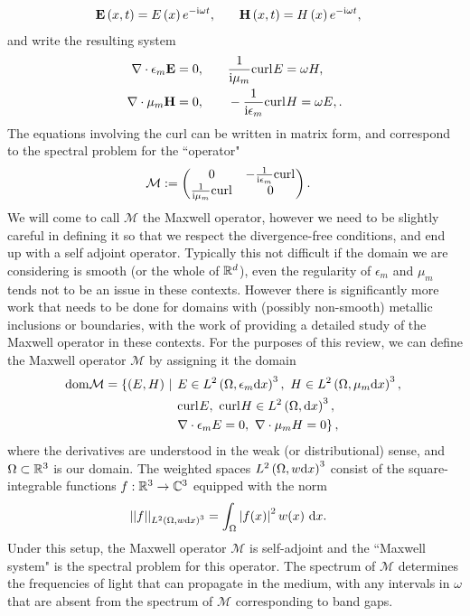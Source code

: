 \begin{align*}
	\mathbf{E}\left( x,t \right) = E\left( x \right)e^{-\mathrm{i}\omega t},
	&\qquad \mathbf{H}\left( x,t \right) = H\left( x \right)e^{-\mathrm{i}\omega t},
\end{align*}
and write the resulting system
\begin{align*}
	\nabla\cdot \epsilon_m \mathbf{E} = 0,
	&\qquad \frac{1}{\mathrm{i}\mu_m}\mathrm{curl}_{}E = \omega H, \\ 
	\nabla\cdot \mu_m \mathbf{H} = 0,
	&\qquad -\frac{1}{\mathrm{i}\epsilon_m}\mathrm{curl}_{}H = \omega E,.
\end{align*}
The equations involving the curl can be written in matrix form, and correspond to the spectral problem for the ``operator" 
\begin{align*}
	\mathcal{M} &:=
	\begin{pmatrix}
		0 & -\frac{1}{\mathrm{i}\epsilon_m}\mathrm{curl}_{} \\
		\frac{1}{\mathrm{i}\mu_m}\mathrm{curl}_{} & 0
	\end{pmatrix}.
\end{align*}
We will come to call $\mathcal{M}$ the Maxwell operator, however we need to be slightly careful in defining it so that we respect the divergence-free conditions, and end up with a self adjoint operator.
Typically this not difficult if the domain we are considering is smooth (or the whole of $\mathbb{R}^d$), even the regularity of $\epsilon_m$ and $\mu_m$ tends not to be an issue in these contexts.
However there is significantly more work that needs to be done for domains with (possibly non-smooth) metallic inclusions or boundaries, with the work of \cite{birman1987l2, birman1989selfadjoint} providing a detailed study of the Maxwell operator in these contexts.
For the purposes of this review, we can define the Maxwell operator $\mathcal{M}$ by assigning it the domain
\begin{align*}
	\mathrm{dom}{\mathcal{M}} = \left\{ \left( E,H \right) \ \middle\vert \right. 
	&
	\left. E\in L^2\left( \Omega, \epsilon_m\mathrm{d} x \right)^3, \ H\in L^2\left( \Omega, \mu_m\mathrm{d} x \right)^3, \right. \\
	&
	\left. \mathrm{curl}_{}E, \ \mathrm{curl}_{}H\in L^{2}\left( \Omega,\mathrm{d}x \right)^3, \right. \\
	&
	\left. \nabla\cdot \epsilon_m E = 0, \ \nabla\cdot \mu_m H = 0 \right\},
\end{align*}
where the derivatives are understood in the weak (or distributional) sense, and $\Omega\subset\mathbb{R}^3$ is our domain.
The weighted spaces $L^2\left( \Omega, w\mathrm{d} x \right)^3$ consist of the square-integrable functions $f:\mathbb{R}^3\rightarrow\mathbb{C}^3$ equipped with the norm
\begin{align*}
	\lvert\lvert  f  \rvert\rvert_{L^2\left( \Omega, w\mathrm{d} x \right)^3} &= \int_{\Omega}\left\lvert f(x) \right\rvert^2 w(x) \ \mathrm{d}x.
\end{align*}
Under this setup, the Maxwell operator $\mathcal{M}$ is self-adjoint and the ``Maxwell system" is the spectral problem for this operator.
The spectrum of $\mathcal{M}$ determines the frequencies of light that can propagate in the medium, with any intervals in $\omega$ that are absent from the spectrum of $\mathcal{M}$ corresponding to band gaps.

